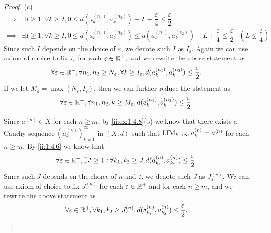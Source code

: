 \begin{proof}{(c)}
\begin{align*}
    \implies & \exists I \geq 1 : \forall k \geq I, 0 \leq d(a_k^{(n_1)}, a_k^{(n_2)}) - L + \dfrac{\varepsilon}{4} \leq \dfrac{\varepsilon}{2}                                                                    \\
    \implies & \exists I \geq 1 : \forall k \geq I, 0 \leq d(a_k^{(n_1)}, a_k^{(n_2)}) \leq d(a_k^{(n_1)}, a_k^{(n_2)}) - L + \dfrac{\varepsilon}{4} \leq \dfrac{\varepsilon}{2} & (L \leq \dfrac{\varepsilon}{4})
  \end{align*}
  Since such \(I\) depends on the choice of \(\varepsilon\), we denote such \(I\) as \(I_\varepsilon\).
  Again we can use axiom of choice to fix \(I_\varepsilon\) for each \(\varepsilon \in \mathbb{R}^+\), and we rewrite the above statement as
  \[
    \forall \varepsilon \in \mathbb{R}^+, \forall n_1, n_2 \geq N_\varepsilon, \forall k \geq I_\varepsilon, d(a_k^{(n_1)}, a_k^{(n_2)}) \leq \dfrac{\varepsilon}{2}.
  \]
  If we let \(M_\varepsilon = \max(N_\varepsilon, I_\varepsilon)\), then we can further reduce the statement as
  \[
    \forall \varepsilon \in \mathbb{R}^+, \forall n_1, n_2, k \geq M_\varepsilon, d(a_k^{(n_1)}, a_k^{(n_2)}) \leq \dfrac{\varepsilon}{2}.
  \]

  Since \(a^{(n)} \in \overline{X}\) for each \(n \geq m\), by \cref{ii:ex:1.4.8}(b) we know that there exists a Cauchy sequence \((a_k^{(n)})_{k = 1}^\infty\) in \((X, d)\) such that \(\operatorname*{LIM}_{k \to \infty} a_k^{(n)} = a^{(n)}\) for each \(n \geq m\).
  By \cref{ii:1.4.6} we know that
  \[
    \forall \varepsilon \in \mathbb{R}^+, \exists J \geq 1 : \forall k_1, k_2 \geq J, d(a_{k_1}^{(n)}, a_{k_2}^{(n)}) \leq \dfrac{\varepsilon}{2}.
  \]
  Since such \(J\) depends on the choice of \(n\) and \(\varepsilon\), we denote such \(J\) as \(J_\varepsilon^{(n)}\).
  We can use axiom of choice to fix \(J_\varepsilon^{(n)}\) for each \(\varepsilon \in \mathbb{R}^+\) and for each \(n \geq m\), and we rewrite the above statement as
  \[
    \forall \varepsilon \in \mathbb{R}^+, \forall k_1, k_2 \geq J_\varepsilon^{(n)}, d(a_{k_1}^{(n)}, a_{k_2}^{(n)}) \leq \dfrac{\varepsilon}{2}.
  \]


\end{proof}
